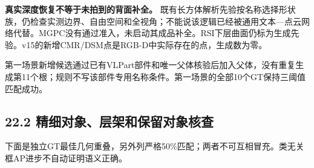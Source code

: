 \documentclass[UTF8,fontset=fandol]{ctexart}
\begin{document}
\textbf{真实深度恢复不等于未拍到的背面补全。} 既有长方体解析先验按名称选择形状族，仍检查实测边界、自由空间和全视角；不能说该逻辑已经被通用文本—点云网络代替。MGPC没有通过准入，未启动其成品补全。RSI下层曲面仍标为生成先验。v15的新增CMR/DSM点是RGB-D中实际存在的点，生成数为零。



第一场景新增候选通过已有VLPart部件和唯一父体核验后加入父体，没有重复生成第11个根；规则不写该部件专用名称条件。第一场景的全部10个GT保持三阈值匹配成功。



\subsection*{22.2 精细对象、层架和保留对象核查}

下面是独立GT最佳几何重叠，另外列严格50\%匹配；两者不可互相冒充。类无关框AP进步不自动证明语义正确。
\end{document}
